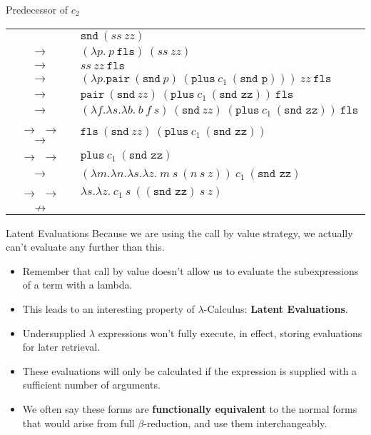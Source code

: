 \documentclass[11pt]{beamer}
\begin{document}
\begin{frame}[fragile=singleslide]{Predecessor of $c_2$}
\begin{tabular}{c l}
 & $\texttt{snd}\:(ss\:zz)$ \\
$\rightarrow$ & $(\lambda p.\:p\:\texttt{fls}) \:(ss\:zz)$ \\
$\rightarrow$ & $ss\:zz\:\texttt{fls} \:$ \\
$\rightarrow$ & $(\lambda p. \texttt{pair}\:(\texttt{snd}\:p)\:(\texttt{plus}\:c_1\:(\texttt{snd p})))\:zz\:\texttt{fls} \:$ \\
$\rightarrow$ & $\texttt{pair}\:(\texttt{snd}\:zz)\:(\texttt{plus}\:c_1\:(\texttt{snd zz}))\:\texttt{fls} \:$ \\
$\rightarrow$ & $(\lambda f. \lambda s. \lambda b.\:b\:f\:s)\:(\texttt{snd}\:zz)\:(\texttt{plus}\:c_1\:(\texttt{snd zz}))\:\texttt{fls} \:$ \\
$\rightarrow$ $\rightarrow$ $\rightarrow$ & $\texttt{fls}\:(\texttt{snd}\:zz)\:(\texttt{plus}\:c_1\:(\texttt{snd zz}))$ \\
$\rightarrow$ $\rightarrow$ & $\texttt{plus}\:c_1\:(\texttt{snd zz})$ \\
$\rightarrow$ & $(\lambda m. \lambda n. \lambda s. \lambda z.\:m\:s\:(n\:s\:z))\:c_1\:(\texttt{snd zz})$ \\
$\rightarrow$ $\rightarrow$ & $\lambda s. \lambda z.\:c_1\:s\:((\texttt{snd zz})\:s\:z)$ \\
$\nrightarrow$ &  \\
\end{tabular}

\end{frame}


\begin{frame}[fragile=singleslide]{Latent Evaluations}
Because we are using the call by value strategy, we actually can't evaluate any further than this.  
\begin{itemize}
\item Remember that call by value doesn't allow us to evaluate the subexpressions of a term with a lambda.
\item This leads to an interesting property of $\lambda$-Calculus: \textbf{Latent Evaluations}.
\item Undersupplied $\lambda$ expressions won't fully execute, in effect, storing evaluations for later retrieval.
\item These evaluations will only be calculated if the expression is supplied with a sufficient number of arguments.  
\item We often say these forms are \textbf{functionally equivalent} to the normal forms that would arise from full $\beta$-reduction, and use them interchangeably.  
\end{itemize}

\end{frame}
\end{document}
